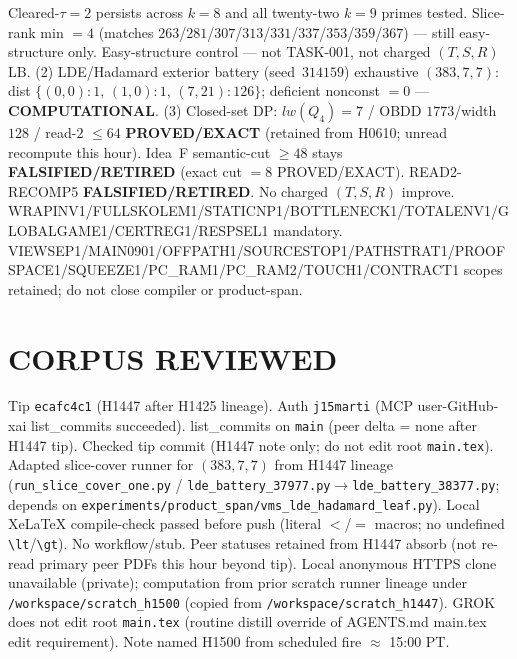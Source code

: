 \documentclass[11pt]{article}
\begin{document}
Cleared-$\tau{=}2$ persists across $k{=}8$ and all twenty-two $k{=}9$ primes tested.
Slice-rank min $=4$ (matches $263$/$281$/$307$/$313$/$331$/$337$/$353$/$359$/$367$) --- still easy-structure only.
Easy-structure control --- not TASK-001, not charged $(T,S,R)$ LB.
(2) LDE/Hadamard exterior battery (seed~$314159$) exhaustive $(383,7,7)$:
dist $\{(0,0){:}1,\,(1,0){:}1,\,(7,21){:}126\}$; deficient nonconst $=0$ --- \textbf{COMPUTATIONAL}.
(3) Closed-set DP: $lw(Q_4)=7$ / OBDD $1773$/width $128$ / read-$2$ $\le64$
\textbf{PROVED/EXACT} (retained from H0610; unread recompute this hour).
Idea~F semantic-cut $\ge48$ stays \textbf{FALSIFIED/RETIRED} (exact cut $=8$ PROVED/EXACT).
READ2-RECOMP5 \textbf{FALSIFIED/RETIRED}. No charged $(T,S,R)$ improve.
WRAPINV1/FULLSKOLEM1/STATICNP1/BOTTLENECK1/TOTALENV1/GLOBALGAME1/CERTREG1/RESPSEL1 mandatory.
VIEWSEP1/MAIN0901/OFFPATH1/SOURCESTOP1/PATHSTRAT1/PROOFSPACE1/SQUEEZE1/PC\_RAM1/PC\_RAM2/TOUCH1/CONTRACT1 scopes retained; do not close compiler or product-span.

\section*{CORPUS REVIEWED}
Tip \texttt{ecafc4c1} (H1447 after H1425 lineage). Auth \texttt{j15marti} (MCP user-GitHub-xai list\_commits succeeded).
list\_commits on \texttt{main} (peer delta = none after H1447 tip).
Checked tip commit (H1447 note only; do not edit root \texttt{main.tex}).
Adapted slice-cover runner for $(383,7,7)$ from H1447 lineage
(\texttt{run\_slice\_cover\_one.py} / \texttt{lde\_battery\_37977.py}$\to$\texttt{lde\_battery\_38377.py};
depends on \texttt{experiments/product\_span/vms\_lde\_hadamard\_leaf.py}).
Local XeLaTeX compile-check passed before push (literal $<$/$=$ macros; no undefined \texttt{\textbackslash lt}/\texttt{\textbackslash gt}).
No workflow/stub. Peer statuses retained from H1447 absorb (not re-read primary peer PDFs this hour beyond tip).
Local anonymous HTTPS clone unavailable (private);
computation from prior scratch runner lineage under \texttt{/workspace/scratch\_h1500}
(copied from \texttt{/workspace/scratch\_h1447}).
GROK does not edit root \texttt{main.tex} (routine distill override of AGENTS.md main.tex edit requirement).
Note named H1500 from scheduled fire $\approx$ 15:00 PT.
\end{document}
